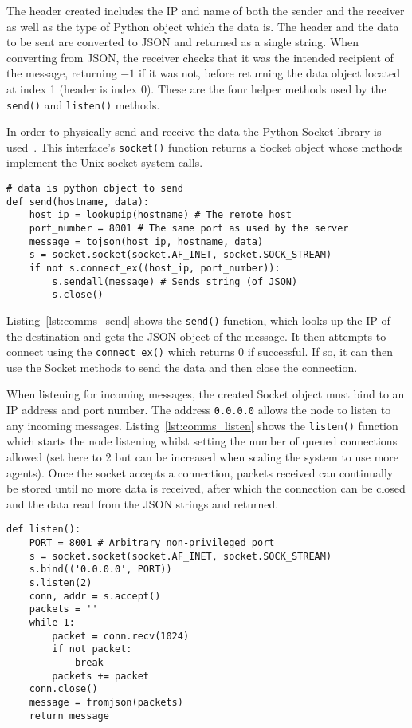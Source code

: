 The header created includes the IP and name of both the sender and the
receiver as well as the type of Python object which the data is. The header
and the data to be sent are converted to JSON and returned as a single
string. When converting from JSON, the receiver checks that it was the
intended recipient of the message, returning $-1$ if it was not, before
returning the data object located at index 1 (header is index 0). These
are the four helper methods used by the \verb|send()| and \verb|listen()|
methods.

In order to physically send and receive the data the Python Socket library
is used~\cite{socketServerDocs}. This interface's \verb|socket()| function
returns a Socket object whose methods implement the Unix socket system calls.

\begin{lstlisting}[caption={send() Function}, label={lst:comms_send}]
# data is python object to send
def send(hostname, data):
    host_ip = lookupip(hostname) # The remote host
    port_number = 8001 # The same port as used by the server
    message = tojson(host_ip, hostname, data)
    s = socket.socket(socket.AF_INET, socket.SOCK_STREAM)
    if not s.connect_ex((host_ip, port_number)):
        s.sendall(message) # Sends string (of JSON)
        s.close()
\end{lstlisting}

Listing~\ref{lst:comms_send} shows the \verb|send()| function, which looks up the IP of the destination and gets the JSON
object of the message. It then attempts to connect using the \verb|connect_ex()|
which returns 0 if successful. If so, it can then use the Socket methods to send
the data and then close the connection.

When listening for incoming messages, the created Socket object must bind to
an IP address and port number. The address \verb|0.0.0.0| allows the node to listen
to any incoming messages. Listing~\ref{lst:comms_listen} shows the \verb|listen()| function which starts the node listening
whilst setting the number of queued connections allowed (set here to 2 but can
be increased when scaling the system to use more agents). Once the socket
accepts a connection, packets received can continually be stored
until no more data is received, after which the connection can be closed and
the data read from the JSON strings and returned.

\begin{lstlisting}[caption={\texttt{listen()} function}, label={lst:comms_listen}]
def listen():
    PORT = 8001 # Arbitrary non-privileged port
    s = socket.socket(socket.AF_INET, socket.SOCK_STREAM)
    s.bind(('0.0.0.0', PORT))
    s.listen(2)
    conn, addr = s.accept()
    packets = ''
    while 1:
        packet = conn.recv(1024)
        if not packet:
            break
        packets += packet
    conn.close()
    message = fromjson(packets)
    return message
\end{lstlisting}

